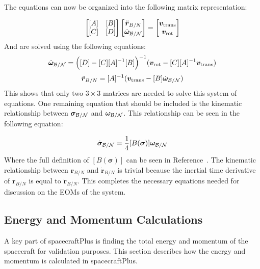 The equations can now be organized into the following matrix representation:

\begin{equation}
\begin{bmatrix}
[A] & [B]\\
[C] & [D]
\end{bmatrix} \begin{bmatrix}
\ddot{\bm r}_{B/N}\\
\dot{\bm\omega}_{\cal B/N}
\end{bmatrix} = \begin{bmatrix}
\bm v_{\text{trans}}\\
\bm v_{\text{rot}}
\end{bmatrix}
\label{eq:backSub}
\end{equation}
And are solved using the following equations:
\begin{equation}
\dot{\bm\omega}_{\cal B/N} = \Big([D] - [C][A]^{-1}[B]\Big)^{-1}(\bm v_{\text{rot}} - [C][A]^{-1}\bm v_{\text{trans}})
\end{equation}
\begin{equation}
\ddot{\bm r}_{B/N} = [A]^{-1} (\bm v_{\text{trans}} - [B]\dot{\bm\omega}_{\cal B/N})
\end{equation}
This shows that only two $3\times 3$ matrices are needed to solve this system of equations. One remaining equation that should be included is the kinematic relationship between $\bm \sigma_{\cal{B}/\cal{N}}$ and $\bm \omega_{\cal{B}/\cal{N}}$. This relationship can be seen in the following equation:

\begin{equation}
\dot{\bm \sigma}_{\cal{B}/\cal{N}} = \frac{1}{4} [B(\bm \sigma)]\bm \omega_{\cal{B}/\cal{N}}
\end{equation}
Where the full definition of $[B(\bm \sigma)]$ can be seen in Reference~\cite{schaub}. The kinematic relationship between $\bm r_{B/N}$ and $\dot{\bm r}_{B/N}$ is trivial because the inertial time derivative of $\bm r_{B/N}$ is equal to $\dot{\bm r}_{B/N}$. This completes the necessary equations needed for discussion on the EOMs of the system.

\subsection{Energy and Momentum Calculations}

A key part of spacecraftPlus is finding the total energy and momentum of the spacecraft for validation purposes. This section describes how the energy and momentum is calculated in spacecraftPlus.

